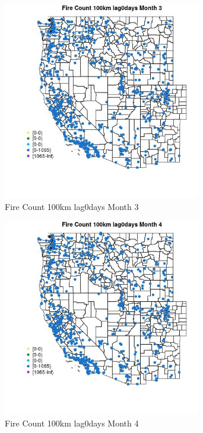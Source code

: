 \begin{figure} 
\centering  
\includegraphics[width=0.77\textwidth]{Code_Outputs/Report_ML_input_PM25_Step4_part_f_de_duplicated_aves_prioritize_24hr_obswNAs_MapObsMo3Fire_Count_100km_lag0days.jpg} 
\caption{\label{fig:Report_ML_input_PM25_Step4_part_f_de_duplicated_aves_prioritize_24hr_obswNAsMapObsMo3Fire_Count_100km_lag0days}Fire Count 100km lag0days Month 3} 
\end{figure} 
 

\clearpage 

\begin{figure} 
\centering  
\includegraphics[width=0.77\textwidth]{Code_Outputs/Report_ML_input_PM25_Step4_part_f_de_duplicated_aves_prioritize_24hr_obswNAs_MapObsMo4Fire_Count_100km_lag0days.jpg} 
\caption{\label{fig:Report_ML_input_PM25_Step4_part_f_de_duplicated_aves_prioritize_24hr_obswNAsMapObsMo4Fire_Count_100km_lag0days}Fire Count 100km lag0days Month 4} 
\end{figure} 
 

